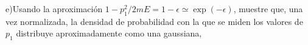 e)Usando la aproximación $1-p_1^2 / 2 m E=1-\epsilon \simeq \exp (-\epsilon)$, muestre que, una vez normalizada, la densidad de probabilidad con la que se miden los valores de $p_1$ distribuye aproximadamente como una gaussiana,